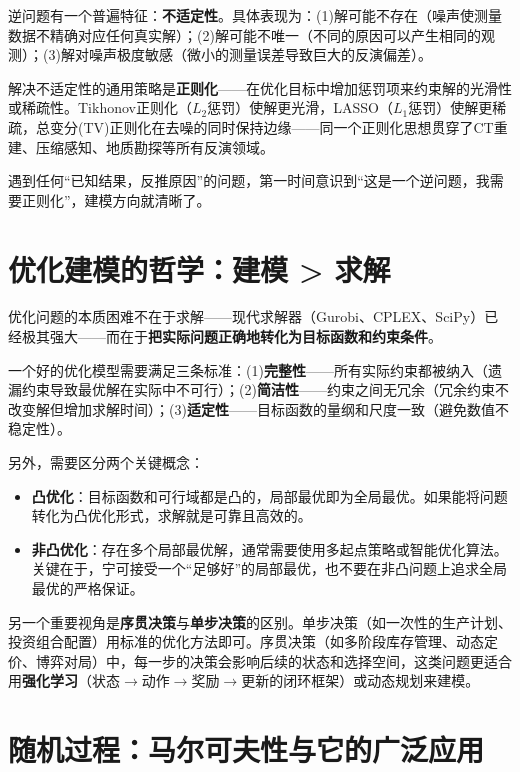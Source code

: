 \documentclass[12pt,a4paper]{ctexart}
\begin{document}
逆问题有一个普遍特征：\textbf{不适定性}。具体表现为：(1)解可能不存在（噪声使测量数据不精确对应任何真实解）；(2)解可能不唯一（不同的原因可以产生相同的观测）；(3)解对噪声极度敏感（微小的测量误差导致巨大的反演偏差）。

解决不适定性的通用策略是\textbf{正则化}——在优化目标中增加惩罚项来约束解的光滑性或稀疏性。Tikhonov正则化（$L_2$惩罚）使解更光滑，LASSO（$L_1$惩罚）使解更稀疏，总变分(TV)正则化在去噪的同时保持边缘——同一个正则化思想贯穿了CT重建、压缩感知、地质勘探等所有反演领域。

遇到任何``已知结果，反推原因''的问题，第一时间意识到``这是一个逆问题，我需要正则化''，建模方向就清晰了。

\section{优化建模的哲学：建模 > 求解}

优化问题的本质困难不在于求解——现代求解器（Gurobi、CPLEX、SciPy）已经极其强大——而在于\textbf{把实际问题正确地转化为目标函数和约束条件}。

一个好的优化模型需要满足三条标准：(1)\textbf{完整性}——所有实际约束都被纳入（遗漏约束导致最优解在实际中不可行）；(2)\textbf{简洁性}——约束之间无冗余（冗余约束不改变解但增加求解时间）；(3)\textbf{适定性}——目标函数的量纲和尺度一致（避免数值不稳定性）。

另外，需要区分两个关键概念：
\begin{itemize}[nosep]
    \item \textbf{凸优化}：目标函数和可行域都是凸的，局部最优即为全局最优。如果能将问题转化为凸优化形式，求解就是可靠且高效的。
    \item \textbf{非凸优化}：存在多个局部最优解，通常需要使用多起点策略或智能优化算法。关键在于，宁可接受一个``足够好''的局部最优，也不要在非凸问题上追求全局最优的严格保证。
\end{itemize}

另一个重要视角是\textbf{序贯决策}与\textbf{单步决策}的区别。单步决策（如一次性的生产计划、投资组合配置）用标准的优化方法即可。序贯决策（如多阶段库存管理、动态定价、博弈对局）中，每一步的决策会影响后续的状态和选择空间，这类问题更适合用\textbf{强化学习}（状态$\to$动作$\to$奖励$\to$更新的闭环框架）或动态规划来建模。

\section{随机过程：马尔可夫性与它的广泛应用}
\end{document}
